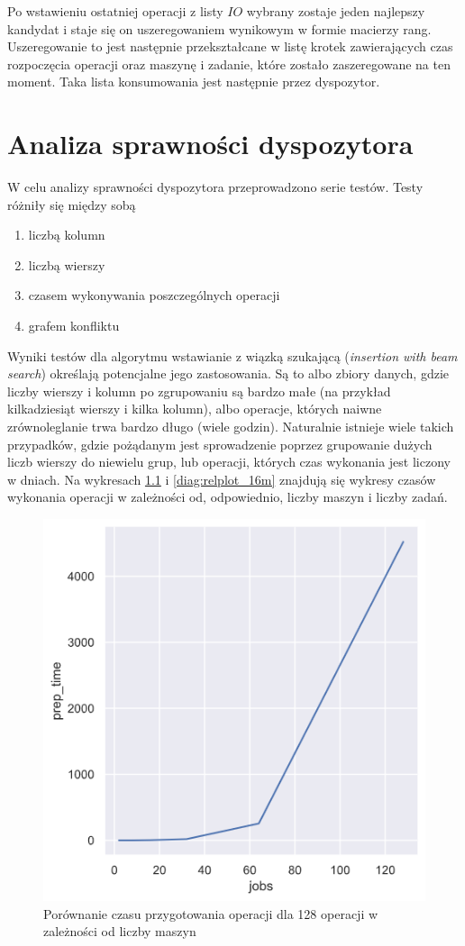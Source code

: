 \documentclass[brudnopis]{xmgr}
\begin{document}
 Po wstawieniu ostatniej operacji z listy $IO$ wybrany zostaje jeden najlepszy kandydat i staje się on uszeregowaniem wynikowym w formie macierzy rang.
 Uszeregowanie to jest następnie przekształcane w listę krotek zawierających czas rozpoczęcia operacji oraz maszynę i zadanie, które zostało zaszeregowane na ten moment. Taka lista konsumowania jest następnie przez dyspozytor.


\chapter{Analiza sprawności dyspozytora}

W celu analizy sprawności dyspozytora przeprowadzono serie testów.
Testy różniły się między sobą
\begin{enumerate}
    \item liczbą kolumn
    \item liczbą wierszy
    \item czasem wykonywania poszczególnych operacji
    \item grafem konfliktu
\end{enumerate}

Wyniki testów dla algorytmu wstawianie z wiązką szukającą (\emph{insertion with beam search}) określają potencjalne jego zastosowania. Są to albo zbiory danych, gdzie liczby wierszy i kolumn po zgrupowaniu są bardzo małe (na przykład kilkadziesiąt wierszy i kilka kolumn), albo operacje, których naiwne zrównoleglanie trwa bardzo długo (wiele godzin). Naturalnie istnieje wiele takich przypadków, gdzie pożądanym jest sprowadzenie poprzez grupowanie dużych liczb wierszy do niewielu grup, lub operacji, których czas wykonania jest liczony w dniach. Na wykresach \ref{diag:relplot_128j} i \ref{diag:relplot_16m} znajdują się wykresy czasów wykonania operacji w zależności od, odpowiednio, liczby maszyn i liczby zadań.

\begin{figure}[!tbh]
\centering
\includegraphics[width=.8\hsize]{fig/relplot_128j.png}
\caption{Porównanie czasu przygotowania operacji dla 128 operacji w zależności od liczby maszyn\label{diag:relplot_128j}}
\end{figure}\medskip
\end{document}
